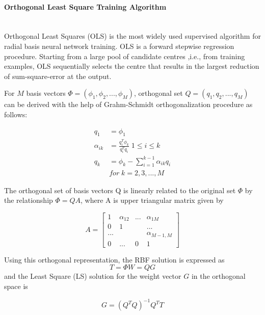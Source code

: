 \documentclass[12pt,a4paper,oneside]{article}
\numberwithin{equation}{section}
\numberwithin{algorithm}{section}
\begin{document}
\paragraph{Orthogonal Least Square Training Algorithm\\\\}\label{ols}

Orthogonal Least Squares (OLS) is the most widely used supervised algorithm for radial basis neural network training. OLS is a forward stepwise regression procedure. Starting from a large pool of candidate centres ,i.e., from training examples, OLS sequentially selects the centre that results in the largest reduction of sum-square-error at the output.

For $M$ basis vectors $\Phi=(\phi_1,\phi_2,...,\phi_M)$, orthogonal set $Q=(q_1,q_2,...,q_M)$ can be derived with the help of Grahm-Schmidt orthogonalization procedure as follows:

\begin{align}
q_1&=\phi_1 \label{q1} \\
\alpha_{ik}&=\frac{q^T_i\phi_k}{q^T_iq_i} \; 1\le i \le k \label{alpha_ik}\\
q_k&=\phi_k-\sum\limits_{i=1}^{k-1}\alpha_{ik}q_i \label{qk}\\
& for \; k=2,3,...,M \nonumber
\end{align}

The orthogonal set of basis vectors Q is linearly related to the original set $\Phi$ by the relationship \cite{Chen1991} $ \Phi=QA \label{orthogonal_representation}$, where A is upper triangular matrix given by

\begin{equation}
A=
\begin{bmatrix}
1&\alpha_{12}&...&\alpha_{1M}\\
0&1&&...\\
...&&&\alpha_{M-1,M}\\
0&...&0&1
\end{bmatrix}
\end{equation}

Using this orthogonal representation, the RBF solution is expressed as
\begin{equation}
T=\Phi W= QG
\end{equation}
and the Least Square (LS) solution for the weight vector $G$ in the orthogonal space is

\begin{equation}
G=(Q^TQ)^{-1}Q^TT
\end{equation}
\end{document}
